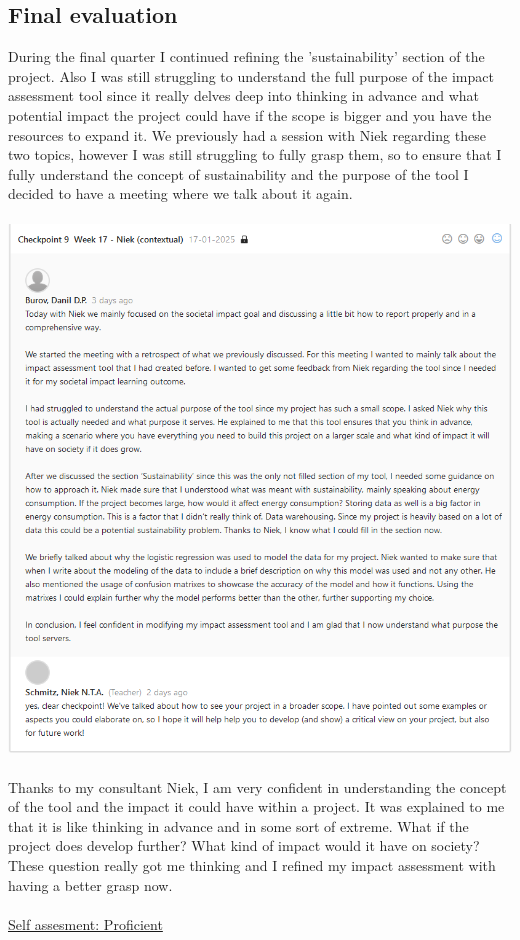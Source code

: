 \documentclass{article}
\begin{document}
	\subsection{Final evaluation} %
	During the final quarter I continued refining the 'sustainability' section of the project. Also I was still struggling to understand the full purpose of the impact assessment tool since it really delves deep into thinking in advance and what potential impact the project could have if the scope is bigger and you have the resources to expand it. We previously had a session with Niek regarding these two topics, however I was still struggling to fully grasp them, so to ensure that I fully understand the concept of sustainability and the purpose of the tool I decided to have a meeting where we talk about it again.\\\\
	 \includegraphics[width=\textwidth]{images/Feedback_Niek_3.png}\\\\
	Thanks to my consultant Niek, I am very confident in understanding the concept of the tool and the impact it could have within a project. It was explained to me that it is like thinking in advance and in some sort of extreme. What if the project does develop further? What kind of impact would it have on society? These question really got me thinking and I refined my impact assessment with having a better grasp now.\\\\
	\underline{Self assesment: Proficient}
	
\end{document}
